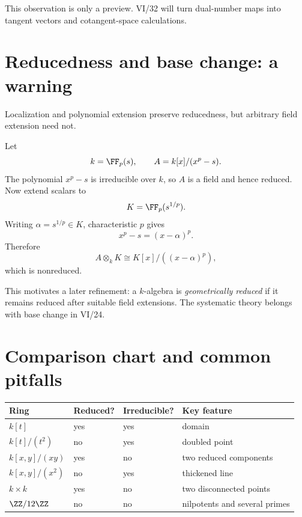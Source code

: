 

This observation is only a preview.  VI/32 will turn dual-number maps into tangent vectors
and cotangent-space calculations.

\section{Reducedness and base change: a warning}

Localization and polynomial extension preserve reducedness, but arbitrary field extension
need not.

Let
\[
k=\FF_p(s),
\qquad
A=k[x]/(x^p-s).
\]
The polynomial $x^p-s$ is irreducible over $k$, so $A$ is a field and hence reduced.
Now extend scalars to
\[
K=\FF_p(s^{1/p}).
\]
Writing $\alpha=s^{1/p}\in K$, characteristic $p$ gives
\[
x^p-s=(x-\alpha)^p.
\]
Therefore
\[
A\otimes_k K
\cong
K[x]/((x-\alpha)^p),
\]
which is nonreduced.



This motivates a later refinement: a $k$-algebra is \emph{geometrically reduced} if it
remains reduced after suitable field extensions.  The systematic theory belongs with base
change in VI/24.

\section{Comparison chart and common pitfalls}

\begin{center}
\small
\renewcommand{\arraystretch}{1.22}
\begin{tabular}{p{}p{}p{}p{}}
\toprule
Ring & Reduced? & Irreducible? & Key feature\\
\midrule
$k[t]$ & yes & yes & domain\\
$k[t]/(t^2)$ & no & yes & doubled point\\
$k[x,y]/(xy)$ & yes & no & two reduced components\\
$k[x,y]/(x^2)$ & no & yes & thickened line\\
$k\times k$ & yes & no & two disconnected points\\
$\ZZ/12\ZZ$ & no & no & nilpotents and several primes\\
\bottomrule
\end{tabular}
\end{center}

